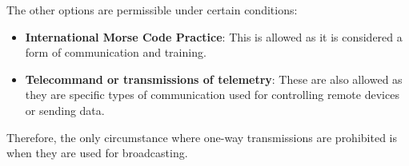The other options are permissible under certain conditions:
\begin{itemize}
    \item \textbf{International Morse Code Practice}: This is allowed as it is considered a form of communication and training.
    \item \textbf{Telecommand or transmissions of telemetry}: These are also allowed as they are specific types of communication used for controlling remote devices or sending data.
\end{itemize}

Therefore, the only circumstance where one-way transmissions are prohibited is when they are used for broadcasting.

